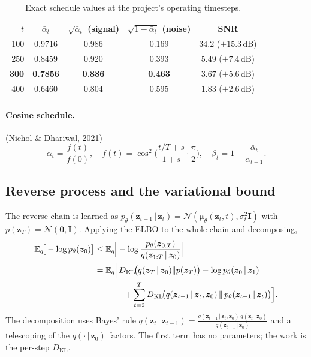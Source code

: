 \documentclass[12pt,a4paper]{article}
\theoremstyle{definition}
\theoremstyle{plain}
\newcommand{\E}{\mathbb{E}}
\newcommand{\N}{\mathcal{N}}
\newcommand{\KL}{D_{\mathrm{KL}}}
\newcommand{\z}{\bm{z}}
\newcommand{\II}{\mathbf{I}}
\newcommand{\abar}{\bar{\alpha}}
\newcommand{\given}{\,\vert\,}
\begin{document}
\begin{table}[h!]
\centering\small
\caption{Exact schedule values at the project's operating timesteps.}
\label{tab:snr}
\begin{tabular}{@{}rcccc@{}}
\toprule
$t$ & $\abar_t$ & $\sqrt{\abar_t}$ (signal) & $\sqrt{1-\abar_t}$ (noise) & SNR \\
\midrule
100 & 0.9716 & 0.986 & 0.169 & $34.2$ ($+15.3$\,dB)\\
250 & 0.8459 & 0.920 & 0.393 & $5.49$ ($+7.4$\,dB)\\
\textbf{300} & \textbf{0.7856} & \textbf{0.886} & \textbf{0.463} & $\mathbf{3.67}$ ($+5.6$\,dB)\\
400 & 0.6460 & 0.804 & 0.595 & $1.83$ ($+2.6$\,dB)\\
\bottomrule
\end{tabular}
\end{table}

\paragraph{Cosine schedule.} (Nichol \& Dhariwal, 2021)
\begin{equation}
\abar_t=\frac{f(t)}{f(0)},\quad
f(t)=\cos^2\!\Big(\frac{t/T+s}{1+s}\cdot\frac{\pi}{2}\Big),\quad
\beta_t=1-\frac{\abar_t}{\abar_{t-1}}.
\end{equation}

\subsection{Reverse process and the variational bound}
The reverse chain is learned as $p_\theta(\z_{t-1}\given\z_t)=\N(\bm\mu_\theta(\z_t,t),\sigma_t^2\II)$
with $p(\z_T)=\N(\bm0,\II)$. Applying the ELBO to the whole chain and decomposing,
\begin{align}
\E_q\!\big[-\log p_\theta(\z_0)\big]
&\le \E_q\!\Big[-\log\frac{p_\theta(\z_{0:T})}{q(\z_{1:T}\given\z_0)}\Big]\\
&=\E_q\Big[\KL\!\big(q(\z_T\given\z_0)\|p(\z_T)\big)
   -\log p_\theta(\z_0\given\z_1)\notag\\
&\hspace{12mm}
   +\sum_{t=2}^{T}\KL\!\big(q(\z_{t-1}\given\z_t,\z_0)\,\|\,p_\theta(\z_{t-1}\given\z_t)\big)\Big].
\label{eq:diff-elbo}
\end{align}
The decomposition uses Bayes' rule
$q(\z_t\given\z_{t-1})=\frac{q(\z_{t-1}\given\z_t,\z_0)\,q(\z_t\given\z_0)}{q(\z_{t-1}\given\z_0)}$
and a telescoping of the $q(\cdot\given\z_0)$ factors. The first term has no
parameters; the work is the per-step $\KL$.
\end{document}

